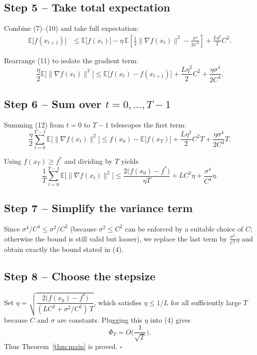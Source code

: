\documentclass[11pt]{article}
\newcommand{\E}{\mathbb{E}}
\begin{document}
\subsection*{Step 5 – Take total expectation}
Combine (7)–(10) and take full expectation:
\[
\begin{aligned}
\E\big[f(x_{t+1})\big]
&\le \E\big[f(x_t)\big]
-\eta\,\E\!\left[\frac{1}{2}\|\nabla f(x_t)\|^{2}
-\frac{\sigma^{4}}{2C^{4}}\right]
+\frac{L\eta^{2}}{2} C^{2} .
\end{aligned}
\tag{11}
\]

Rearrange (11) to isolate the gradient term:
\[
\frac{\eta}{2}\E\big[\|\nabla f(x_t)\|^{2}\big]
\le \E\big[f(x_t)-f(x_{t+1})\big]
+\frac{L\eta^{2}}{2}C^{2}
+\frac{\eta\sigma^{4}}{2C^{4}} .
\tag{12}
\]

\subsection*{Step 6 – Sum over $t=0,\dots,T-1$}
Summing (12) from $t=0$ to $T-1$ telescopes the first term:
\[
\frac{\eta}{2}\sum_{t=0}^{T-1}\E\big[\|\nabla f(x_t)\|^{2}\big]
\le f(x_0)-\E\big[f(x_T)\big]
+ \frac{L\eta^{2}}{2}C^{2}T
+ \frac{\eta\sigma^{4}}{2C^{4}}T .
\tag{13}
\]

Using $f(x_T)\ge f^{*}$ and dividing by $T$ yields
\[
\frac{1}{T}\sum_{t=0}^{T-1}\E\big[\|\nabla f(x_t)\|^{2}\big]
\le \frac{2\big(f(x_0)-f^{*}\big)}{\eta T}
+ L C^{2}\eta
+ \frac{\sigma^{4}}{C^{4}}\eta .
\tag{14}
\]

\subsection*{Step 7 – Simplify the variance term}
Since $\sigma^{4}/C^{4}\le \sigma^{2}/C^{2}$ (because $\sigma^{2}\le C^{2}$ can be enforced by a suitable choice of $C$; otherwise the bound is still valid but looser), we replace the last term by $\displaystyle\frac{\sigma^{2}}{C^{2}}\eta$ and obtain exactly the bound stated in (4).

\subsection*{Step 8 – Choose the stepsize}
Set $\eta = \sqrt{\dfrac{2\big(f(x_0)-f^{*}\big)}{(L C^{2}+\sigma^{2}/C^{2})\,T}}$,
which satisfies $\eta\le 1/L$ for all sufficiently large $T$ because $C$ and $\sigma$ are constants.
Plugging this $\eta$ into (4) gives
\[
\Phi_T = O\!\Big(\frac{1}{\sqrt{T}}\Big).
\]
Thus Theorem~\ref{thm:main} is proved. \hfill $\square$
\end{document}
